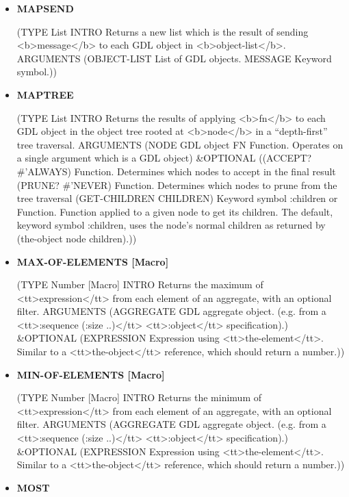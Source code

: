 \documentclass [11pt]{book}
\begin{document}
\begin{itemize}
\item {}
\label{prim:mapsend}
\textbf{MAPSEND}

(TYPE List INTRO  Returns a new list which is the result of sending <b>message</b> to each GDL
object in <b>object-list</b>.
 ARGUMENTS (OBJECT-LIST List of GDL objects. MESSAGE Keyword symbol.))



\item {}
\label{prim:maptree}
\textbf{MAPTREE}

(TYPE List INTRO  Returns the results of applying <b>fn</b> to each GDL object in the object
tree rooted at <b>node</b> in a ``depth-first'' tree traversal.
 ARGUMENTS (NODE GDL object FN Function. Operates on a single argument which is a GDL object) \&OPTIONAL ((ACCEPT? \#'ALWAYS) Function. Determines which nodes to accept in the final result (PRUNE? \#'NEVER) Function. Determines which nodes to prune from the tree traversal (GET-CHILDREN CHILDREN) Keyword symbol :children or Function. Function applied to
a given node to get its children. The default, keyword symbol :children, uses the node's normal
children as returned by (the-object node children).))



\item {}
\label{prim:max-of-elements}
\textbf{MAX-OF-ELEMENTS [Macro]}

(TYPE Number [Macro] INTRO  Returns the maximum of <tt>expression</tt> from each element of an aggregate,
with an optional filter.
 ARGUMENTS (AGGREGATE GDL aggregate object. (e.g. from a <tt>:sequence (:size ..)</tt> <tt>:object</tt> specification).) \&OPTIONAL (EXPRESSION Expression using <tt>the-element</tt>. Similar to a <tt>the-object</tt> reference, which should return a number.))



\item {}
\label{prim:min-of-elements}
\textbf{MIN-OF-ELEMENTS [Macro]}

(TYPE Number [Macro] INTRO  Returns the minimum of <tt>expression</tt> from each element of an aggregate,
with an optional filter.
 ARGUMENTS (AGGREGATE GDL aggregate object. (e.g. from a <tt>:sequence (:size ..)</tt> <tt>:object</tt> specification).) \&OPTIONAL (EXPRESSION Expression using <tt>the-element</tt>. Similar to a <tt>the-object</tt> reference, which should return a number.))



\item {}
\label{prim:most}
\textbf{MOST}


\end{itemize}
\end{document}
